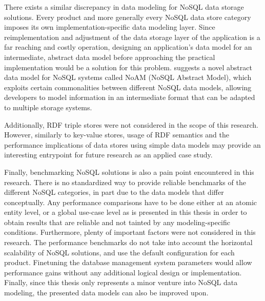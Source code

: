 There exists a similar discrepancy in data modeling for NoSQL data storage solutions.
Every product and more generally every NoSQL data store category imposes its own implementation-specific data modeling layer.
Since reimplementation and adjustment of the data storage layer of the application is a far reaching and costly operation, designing an application's data model for an intermediate, abstract data model before approaching the practical implementation would be a solution for this problem.
\citeauthor{Bugiotti2014} suggests a novel abstract data model for NoSQL systems called NoAM (NoSQL Abstract Model), which exploits certain commonalities between different NoSQL data models, allowing developers to model information in an intermediate format that can be adapted to multiple storage systems.

Additionally, RDF triple stores were not considered in the scope of this research.
However, similarly to key-value stores, usage of RDF semantics and the performance implications of data stores using simple data models may provide an interesting entrypoint for future research as an applied case study.

Finally, benchmarking NoSQL solutions is also a pain point encountered in this research.
There is no standardized way to provide reliable benchmarks of the different NoSQL categories, in part due to the data models that differ conceptually.
Any performance comparisons have to be done either at an atomic entity level, or a global use-case level as is presented in this thesis in order to obtain results that are reliable and not tainted by any modeling-specific conditions.
Furthermore, plenty of important factors were not considered in this research.
The performance benchmarks do not take into account the horizontal scalability of NoSQL solutions, and use the default configuration for each product.
Finetuning the database management system parameters would allow performance gains without any additional logical design or implementation.
Finally, since this thesis only represents a minor venture into NoSQL data modeling, the presented data models can also be improved upon.
